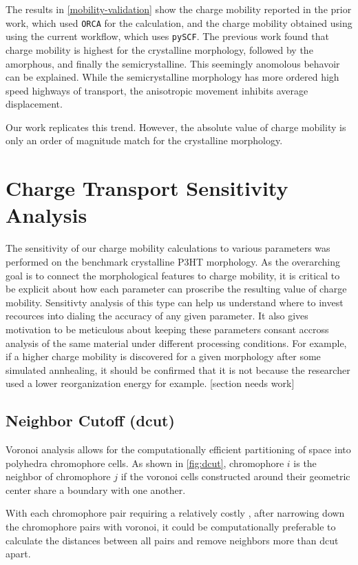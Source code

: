 The results in \ref{mobility-validation} show the charge mobility reported in the prior work, which used \texttt{ORCA} for
the  calculation, and the charge mobility obtained using using the current workflow, which uses \texttt{pySCF}. 
The previous work found that charge mobility is highest for the crystalline morphology, followed by the
amorphous, and finally the semicrystalline. This seemingly anomolous behavoir can be explained. While the
semicrystalline morphology has more ordered high speed highways of transport, the anisotropic movement
inhibits average displacement. 

Our work replicates this trend. However, the absolute value of charge mobility is only an order of magnitude
match for the crystalline morphology. 

\section{Charge Transport Sensitivity Analysis}

\label{sensitivity}

The sensitivity of our charge mobility calculations to various parameters was performed on the benchmark 
crystalline P3HT morphology. As the overarching goal is to connect the morphological features to charge
mobility, it is critical to be explicit about how each parameter can proscribe the resulting value of charge
mobility. Sensitivty analysis of this type can help us understand where to invest recources into dialing
the accuracy of any given parameter. It also gives motivation to be meticulous about keeping these parameters
consant accross analysis of the same material under different processing conditions. For example, if a higher
charge mobility is discovered for a given morphology after some simulated annhealing,
it should be confirmed that it is not because the researcher used a lower reorganization energy for example. 
[section needs work]


\subsection{Neighbor Cutoff (dcut)}
\label{dcutresults}
Voronoi analysis allows for the computationally efficient partitioning of space into
polyhedra chromophore cells. As shown in \ref{fig:dcut}, chromophore $i$ is the neighbor of chromophore $j$
if the voronoi cells constructed around their geometric center
share a boundary with one another. 

With each chromophore pair requiring a relatively costly , after narrowing down the chromophore pairs with voronoi, it
could be
computationally preferable to calculate the distances between all pairs and remove neighbors more than dcut
apart.

